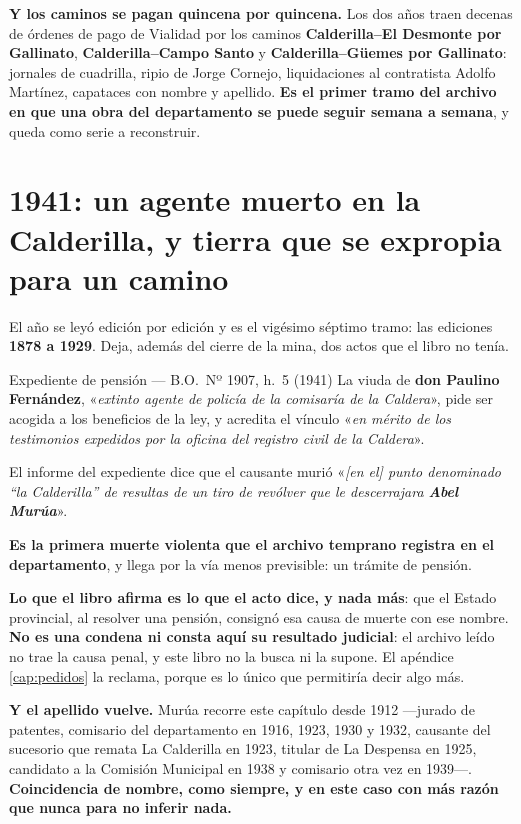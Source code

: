 \begin{cautela}
\textbf{Y los caminos se pagan quincena por quincena.} Los dos años traen
decenas de órdenes de pago de Vialidad por los caminos \textbf{Calderilla--El
Desmonte por Gallinato}, \textbf{Calderilla--Campo Santo} y
\textbf{Calderilla--Güemes por Gallinato}: jornales de cuadrilla, ripio de
Jorge Cornejo, liquidaciones al contratista Adolfo Martínez, capataces con
nombre y apellido. \textbf{Es el primer tramo del archivo en que una obra del
departamento se puede seguir semana a semana}, y queda como serie a reconstruir.
\end{cautela}

\section{1941: un agente muerto en la Calderilla, y tierra que se expropia para un camino}

El año se leyó edición por edición y es el vigésimo séptimo tramo: las ediciones
\textbf{1878 a 1929}. Deja, además del cierre de la mina, dos actos que el libro
no tenía.

\begin{ficha}{Expediente de pensión --- B.O.\ Nº 1907, h.\ 5 (1941)}
La viuda de \textbf{don Paulino Fernández}, «\textit{extinto agente de policía de
la comisaría de la Caldera}», pide ser acogida a los beneficios de la ley, y
acredita el vínculo «\textit{en mérito de los testimonios expedidos por la
oficina del registro civil de la Caldera}».

El informe del expediente dice que el causante murió «\textit{[en el] punto
denominado “la Calderilla” de resultas de un tiro de revólver que le
descerrajara \textbf{Abel Murúa}}».
\end{ficha}

\begin{cautela}
\textbf{Es la primera muerte violenta que el archivo temprano registra en el
departamento}, y llega por la vía menos previsible: un trámite de pensión.

\textbf{Lo que el libro afirma es lo que el acto dice, y nada más}: que el
Estado provincial, al resolver una pensión, consignó esa causa de muerte con
ese nombre. \textbf{No es una condena ni consta aquí su resultado judicial}: el
archivo leído no trae la causa penal, y este libro no la busca ni la supone. El
apéndice \ref{cap:pedidos} la reclama, porque es lo único que permitiría decir
algo más.

\textbf{Y el apellido vuelve.} Murúa recorre este capítulo desde 1912 ---jurado
de patentes, comisario del departamento en 1916, 1923, 1930 y 1932, causante del
sucesorio que remata La Calderilla en 1923, titular de La Despensa en 1925,
candidato a la Comisión Municipal en 1938 y comisario otra vez en 1939---.
\textbf{Coincidencia de nombre, como siempre, y en este caso con más razón que
nunca para no inferir nada.}
\end{cautela}

